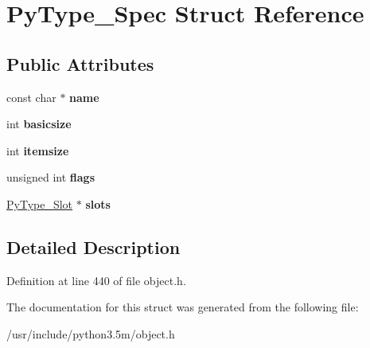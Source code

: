 \hypertarget{structPyType__Spec}{}\section{Py\+Type\+\_\+\+Spec Struct Reference}
\label{structPyType__Spec}
\subsection*{Public Attributes}
\begin{DoxyCompactItemize}
\item 
const char $\ast$ {\bfseries name}\hypertarget{structPyType__Spec_a9bf5f5c6c9987affcd79a48adb4833e5}{}\label{structPyType__Spec_a9bf5f5c6c9987affcd79a48adb4833e5}

\item 
int {\bfseries basicsize}\hypertarget{structPyType__Spec_af1c4fa4b3de90bba4a26b9b0558f8a0d}{}\label{structPyType__Spec_af1c4fa4b3de90bba4a26b9b0558f8a0d}

\item 
int {\bfseries itemsize}\hypertarget{structPyType__Spec_ae9c6cf4d58317f81fb769a694710ac83}{}\label{structPyType__Spec_ae9c6cf4d58317f81fb769a694710ac83}

\item 
unsigned int {\bfseries flags}\hypertarget{structPyType__Spec_ac2892b03ea6044b1aa937d5e4afcde89}{}\label{structPyType__Spec_ac2892b03ea6044b1aa937d5e4afcde89}

\item 
\hyperlink{structPyType__Slot}{Py\+Type\+\_\+\+Slot} $\ast$ {\bfseries slots}\hypertarget{structPyType__Spec_a24cd4d6599b06ed0a942e1c59fd35772}{}\label{structPyType__Spec_a24cd4d6599b06ed0a942e1c59fd35772}

\end{DoxyCompactItemize}


\subsection{Detailed Description}


Definition at line 440 of file object.\+h.



The documentation for this struct was generated from the following file\+:\begin{DoxyCompactItemize}
\item 
/usr/include/python3.\+5m/object.\+h\end{DoxyCompactItemize}
